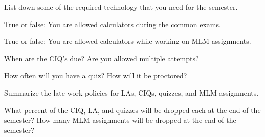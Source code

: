 \documentclass{exam}
\numberwithin{equation}{section} %
\numberwithin{figure}{section} %
\numberwithin{table}{section} %
\begin{document}
\begin{questions}
\begin{solution}[\stretch{1}]
\end{solution}


\question List down some of the required technology that you need for the semester.
\begin{solution}[\stretch{2}]

\end{solution}


\question True or false: You are allowed calculators during the common exams.
\begin{solution}[\stretch{1}]

\end{solution}

\question True or false: You are allowed calculators while working on MLM assignments.
\begin{solution}[\stretch{1}]

\end{solution}

\newpage


\question When are the CIQ's due? Are you allowed multiple attempts?%
\begin{solution}[\stretch{1}]

\end{solution}

\question How often will you have a quiz? How will it be proctored?
\begin{solution}[\stretch{1}]

\end{solution}


\question Summarize the late work policies for LAs, CIQs, quizzes, and MLM assignments.
\begin{solution}[\stretch{2}]

\end{solution}


\question What percent of the CIQ, LA, and quizzes will be dropped each at the end of the semester? How many MLM assignments will be dropped at the end of the semester?
\begin{solution}[\stretch{1}]

\end{solution}



\end{questions}
\end{document}
